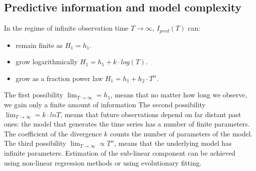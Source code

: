\subsection{Predictive information and model complexity}
In the regime of infinite observation time $T\rightarrow \infty$, $I_{pred}(T)$ can:
\begin{itemize}
 \item remain finite as $H_1=h_1$.
 \item grow logarithmically $H_1=h_1 + k \cdot log(T)$.
 \item grow as a fraction power law $H_1=h_1 + h_2 \cdot T^{\alpha}$.
\end{itemize}
The first possibility \textbf{$\lim_{T\to\infty}=h_1$}, means that no matter how
 long we observe, we gain only a finite amount of information
The second possibility \textbf{$\lim_{T\to\infty}= k\cdot lnT$}, means that future
 observations depend on far distant past ones: the model that generates the time
 series has a number of finite parameters. The coefficient of the divergence $k$
counts the number of parameters of the model.
The third possibility \textbf{$\lim_{T\to\infty} \propto T^{\alpha}$}, means that
the underlying model has infinite parameters.
Estimation of the sub-linear component can be achieved using non-linear regression
 methods or using evolutionary fitting.


